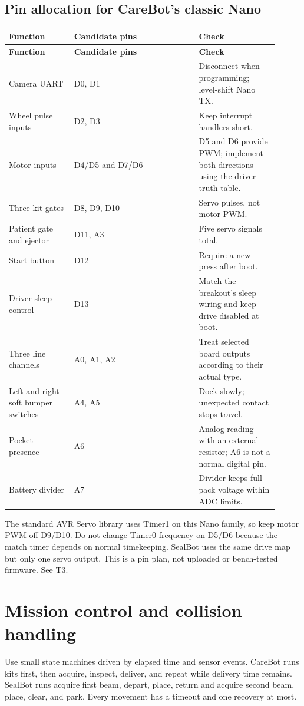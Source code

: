 \documentclass[10pt,a4paper]{article}
\begin{document}
\subsection{Pin allocation for CareBot's classic Nano}
\small\begin{longtable}{@{}>{\raggedright\arraybackslash}p{0.22\linewidth}>{\raggedright\arraybackslash}p{0.42\linewidth}>{\raggedright\arraybackslash}p{0.27\linewidth}@{}}
\toprule
\textbf{Function} & \textbf{Candidate pins} & \textbf{Check} \\
\midrule\endfirsthead
\toprule\textbf{Function} & \textbf{Candidate pins} & \textbf{Check} \\\midrule\endhead
Camera UART & D0, D1 & Disconnect when programming; level-shift Nano TX. \\[3pt]
Wheel pulse inputs & D2, D3 & Keep interrupt handlers short. \\[3pt]
Motor inputs & D4/D5 and D7/D6 & D5 and D6 provide PWM; implement both directions using the driver truth table. \\[3pt]
Three kit gates & D8, D9, D10 & Servo pulses, not motor PWM. \\[3pt]
Patient gate and ejector & D11, A3 & Five servo signals total. \\[3pt]
Start button & D12 & Require a new press after boot. \\[3pt]
Driver sleep control & D13 & Match the breakout's sleep wiring and keep drive disabled at boot. \\[3pt]
Three line channels & A0, A1, A2 & Treat selected board outputs according to their actual type. \\[3pt]
Left and right soft bumper switches & A4, A5 & Dock slowly; unexpected contact stops travel. \\[3pt]
Pocket presence & A6 & Analog reading with an external resistor; A6 is not a normal digital pin. \\[3pt]
Battery divider & A7 & Divider keeps full pack voltage within ADC limits. \\[3pt]
\bottomrule\end{longtable}\normalsize
The standard AVR Servo library uses Timer1 on this Nano family, so keep motor PWM off D9/D10. Do not change Timer0 frequency on D5/D6 because the match timer depends on normal timekeeping. SealBot uses the same drive map but only one servo output. This is a pin plan, not uploaded or bench-tested firmware. See T3.

\section{Mission control and collision handling}
Use small state machines driven by elapsed time and sensor events. CareBot runs kits first, then acquire, inspect, deliver, and repeat while delivery time remains. SealBot runs acquire first beam, depart, place, return and acquire second beam, place, clear, and park. Every movement has a timeout and one recovery at most.
\end{document}
